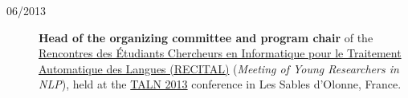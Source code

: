 \begin{description}
    \item[06/2013] \textbf{Head of the organizing committee and program chair} of the \href{https://aclanthology.org/F13-5000.pdf}{Rencontres des Étudiants Chercheurs en Informatique pour le Traitement Automatique des Langues (RECITAL)} (\emph{Meeting of Young Researchers in NLP}), held at the \href{https://aclanthology.org/volumes/F13-1/}{TALN 2013} conference in Les Sables d’Olonne, France.


\end{description}
